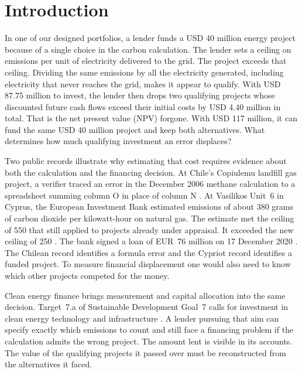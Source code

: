 \documentclass[ijfs,article,submit,oneauthor]{Definitions/mdpi}
\begin{document}
\makeatletter
\apptocmd{\ps@plain}{\fancyfoot[R]{}}{}{}
\makeatother
\fancyfoot[R]{}
\section{Introduction}
In one of our designed portfolios, a lender funds a USD 40 million energy project because of a single choice in the carbon calculation. The lender sets a ceiling on emissions per unit of electricity delivered to the grid. The project exceeds that ceiling. Dividing the same emissions by all the electricity generated, including electricity that never reaches the grid, makes it appear to qualify. With USD 87.75 million to invest, the lender then drops two qualifying projects whose discounted future cash flows exceed their initial costs by USD 4.40 million in total. That is the net present value (NPV) forgone. With USD 117 million, it can fund the same USD 40 million project and keep both alternatives. What determines how much qualifying investment an error displaces?

Two public records illustrate why estimating that cost requires evidence about both the calculation and the financing decision. At Chile's Copiulemu landfill gas project, a verifier traced an error in the December 2006 methane calculation to a spreadsheet summing column O in place of column N \citep[p.~11]{sgs}. At Vasilikos Unit~6 in Cyprus, the European Investment Bank estimated emissions of about 380 grams of carbon dioxide per kilowatt-hour on natural gas. The estimate met the ceiling of 550 that still applied to projects already under appraisal. It exceeded the new ceiling of 250 \citep{eibscore,eibmid}. The bank signed a loan of EUR~76 million on 17 December 2020 \citep{eibloan}. The Chilean record identifies a formula error and the Cypriot record identifies a funded project. To measure financial displacement one would also need to know which other projects competed for the money.

Clean energy finance brings measurement and capital allocation into the same decision. Target~7.a of Sustainable Development Goal~7 calls for investment in clean energy technology and infrastructure \citep{un}. A lender pursuing that aim can specify exactly which emissions to count and still face a financing problem if the calculation admits the wrong project. The amount lent is visible in its accounts. The value of the qualifying projects it passed over must be reconstructed from the alternatives it faced.
\end{document}

